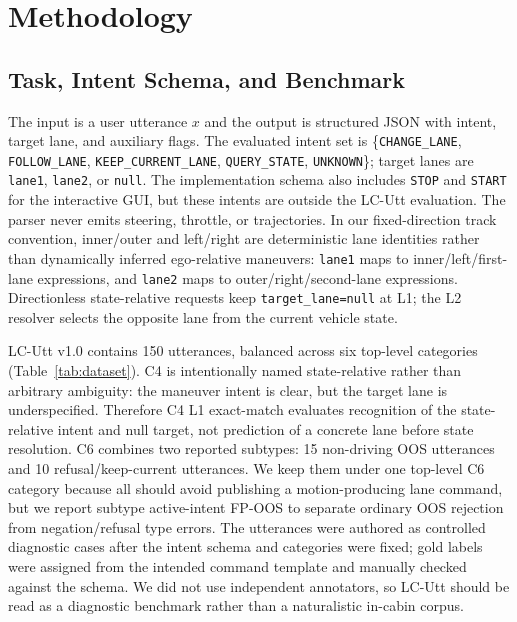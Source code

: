 \documentclass[conference]{IEEEtran}
\begin{document}
\section{Methodology}
\subsection{Task, Intent Schema, and Benchmark}
The input is a user utterance $x$ and the output is structured JSON with intent, target lane, and auxiliary flags. The evaluated intent set is \{\texttt{CHANGE\_LANE}, \texttt{FOLLOW\_LANE}, \texttt{KEEP\_CURRENT\_LANE}, \texttt{QUERY\_STATE}, \texttt{UNKNOWN}\}; target lanes are \texttt{lane1}, \texttt{lane2}, or \texttt{null}. The implementation schema also includes \texttt{STOP} and \texttt{START} for the interactive GUI, but these intents are outside the LC-Utt evaluation. The parser never emits steering, throttle, or trajectories. In our fixed-direction track convention, inner/outer and left/right are deterministic lane identities rather than dynamically inferred ego-relative maneuvers: \texttt{lane1} maps to inner/left/first-lane expressions, and \texttt{lane2} maps to outer/right/second-lane expressions. Directionless state-relative requests keep \texttt{target\_lane=null} at L1; the L2 resolver selects the opposite lane from the current vehicle state.

LC-Utt v1.0 contains 150 utterances, balanced across six top-level categories (Table~\ref{tab:dataset}). C4 is intentionally named state-relative rather than arbitrary ambiguity: the maneuver intent is clear, but the target lane is underspecified. Therefore C4 L1 exact-match evaluates recognition of the state-relative intent and null target, not prediction of a concrete lane before state resolution. C6 combines two reported subtypes: 15 non-driving OOS utterances and 10 refusal/keep-current utterances. We keep them under one top-level C6 category because all should avoid publishing a motion-producing lane command, but we report subtype active-intent FP-OOS to separate ordinary OOS rejection from negation/refusal type errors. The utterances were authored as controlled diagnostic cases after the intent schema and categories were fixed; gold labels were assigned from the intended command template and manually checked against the schema. We did not use independent annotators, so LC-Utt should be read as a diagnostic benchmark rather than a naturalistic in-cabin corpus.


\end{document}
